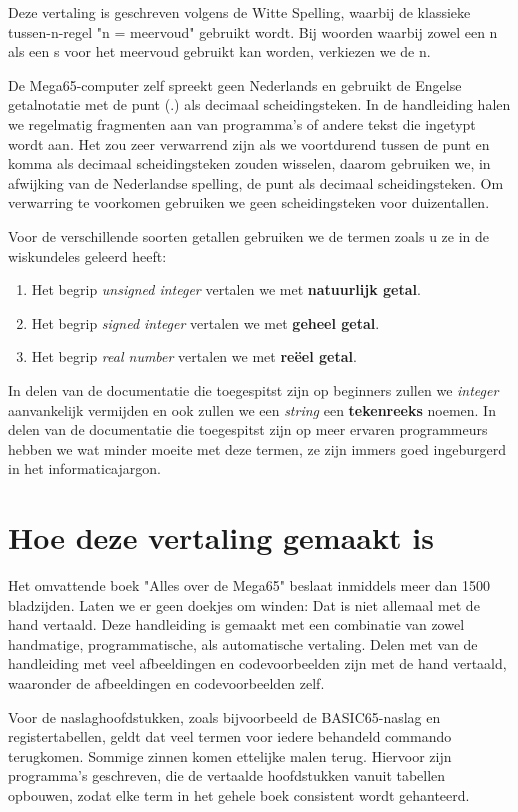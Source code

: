 Deze vertaling is geschreven volgens de Witte Spelling, waarbij de klassieke tussen-n-regel "n = meervoud" gebruikt wordt.
Bij woorden waarbij zowel een n als een s voor het meervoud gebruikt kan worden, verkiezen we de n.

De Mega65-computer zelf spreekt geen Nederlands en gebruikt de Engelse getalnotatie met de punt (.) als decimaal
scheidingsteken. In de handleiding halen we regelmatig fragmenten aan van programma's of andere tekst die ingetypt
wordt aan. Het zou zeer verwarrend zijn als we voortdurend tussen de punt en komma als decimaal
scheidingsteken zouden wisselen, daarom gebruiken we, in afwijking van de Nederlandse spelling, de punt als decimaal
scheidingsteken. Om verwarring te voorkomen gebruiken we geen scheidingsteken voor duizentallen.

Voor de verschillende soorten getallen gebruiken we de termen zoals u ze in de wiskundeles geleerd heeft:
\begin{enumerate}
\item Het begrip {\em unsigned integer} vertalen we met {\bf natuurlijk getal}.
\item Het begrip {\em signed integer} vertalen we met {\bf geheel getal}.
\item Het begrip {\em real number} vertalen we met {\bf reëel getal}.
\end{enumerate}

In delen van de documentatie die toegespitst zijn op beginners zullen we {\em integer} aanvankelijk vermijden
en ook zullen we een {\em string} een {\bf tekenreeks} noemen. In delen van de documentatie die toegespitst zijn op
meer ervaren programmeurs hebben we wat minder moeite met deze termen, ze zijn immers goed ingeburgerd in het
informaticajargon.

\section{Hoe deze vertaling gemaakt is}

Het omvattende boek "Alles over de Mega65" beslaat inmiddels meer dan 1500 bladzijden. Laten we er geen doekjes om winden: Dat
is niet allemaal met de hand vertaald. Deze handleiding is gemaakt met een combinatie van zowel handmatige, programmatische,
als automatische vertaling. Delen met van de handleiding met veel afbeeldingen en codevoorbeelden zijn met de hand vertaald,
waaronder de afbeeldingen en codevoorbeelden zelf.

Voor de naslaghoofdstukken, zoals bijvoorbeeld de BASIC65-naslag en registertabellen, geldt dat veel termen voor iedere
behandeld commando terugkomen. Sommige zinnen komen ettelijke malen terug. Hiervoor zijn programma's geschreven, die de
vertaalde hoofdstukken vanuit tabellen opbouwen, zodat elke term in het gehele boek consistent wordt gehanteerd.

